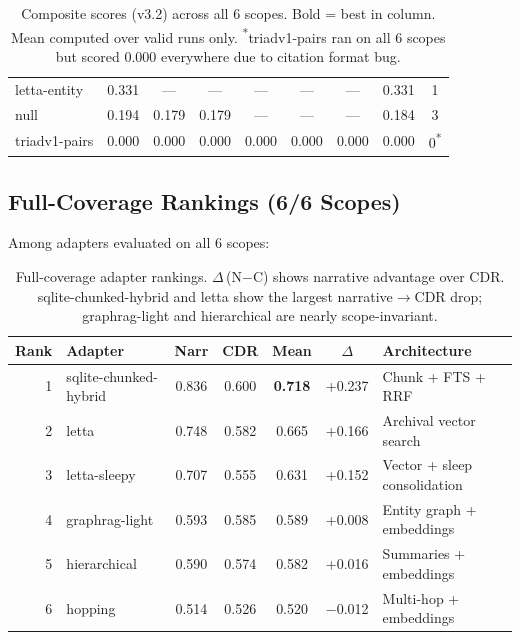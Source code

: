 \documentclass[11pt,letterpaper]{article}
\begin{document}
\begin{table}[H]
\begin{tabular}{lcccccccc}
letta-entity & 0.331 & --- & --- & --- & --- & --- & 0.331 & 1 \\
\addlinespace
\rowcolor{zerorow}
null & 0.194 & 0.179 & 0.179 & --- & --- & --- & 0.184 & 3 \\
\rowcolor{zerorow}
triadv1-pairs & 0.000 & 0.000 & 0.000 & 0.000 & 0.000 & 0.000 & 0.000 & 0\textsuperscript{*} \\
\bottomrule
\end{tabular}
\caption{Composite scores (v3.2) across all 6 scopes. Bold = best in column. Mean computed over valid runs only. \textsuperscript{*}triadv1-pairs ran on all 6 scopes but scored 0.000 everywhere due to citation format bug.}
\label{tab:matrix}
\end{table}

\subsection{Full-Coverage Rankings (6/6 Scopes)}

Among adapters evaluated on all 6 scopes:

\begin{table}[H]
\centering
\small
\begin{tabular}{rlccccl}
\toprule
\textbf{Rank} & \textbf{Adapter} & \textbf{Narr} & \textbf{CDR} & \textbf{Mean} & \textbf{$\Delta$} & \textbf{Architecture} \\
\midrule
\rowcolor{toprow}
1 & sqlite-chunked-hybrid & 0.836 & 0.600 & \textbf{0.718} & +0.237 & Chunk + FTS + RRF \\
\rowcolor{toprow}
2 & letta & 0.748 & 0.582 & 0.665 & +0.166 & Archival vector search \\
3 & letta-sleepy & 0.707 & 0.555 & 0.631 & +0.152 & Vector + sleep consolidation \\
4 & graphrag-light & 0.593 & 0.585 & 0.589 & +0.008 & Entity graph + embeddings \\
5 & hierarchical & 0.590 & 0.574 & 0.582 & +0.016 & Summaries + embeddings \\
6 & hopping & 0.514 & 0.526 & 0.520 & $-$0.012 & Multi-hop + embeddings \\
\bottomrule
\end{tabular}
\caption{Full-coverage adapter rankings. $\Delta$\,(N$-$C) shows narrative advantage over CDR. sqlite-chunked-hybrid and letta show the largest narrative$\to$CDR drop; graphrag-light and hierarchical are nearly scope-invariant.}
\label{tab:rankings}
\end{table}
\end{document}
